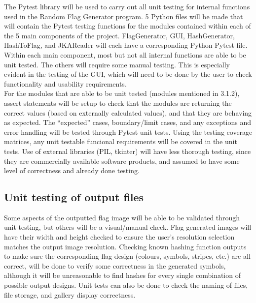 \documentclass[12pt, titlepage]{article}
\begin{document}
The Pytest library will be used to carry out all unit testing for internal
functions used in the Random Flag Generator program. 5 Python files will be
made that will contain the Pytest testing functions for the modules contained
within each of the 5 main components of the project. FlagGenerator, GUI,
HashGenerator, HashToFlag, and JKAReader will each have a corresponding Python
Pytest file. Within each main component, most but not all internal functions
are able to be unit tested. The others will require some manual testing. This
is especially evident in the testing of the GUI, which will need to be done by
the user to check functionality and usability requirements. \\

\noindent For the modules that are able to be unit tested (modules mentioned
in 3.1.2), assert statements will be setup to check that the modules are
returning the correct values (based on externally calculated values), and that
they are behaving as expected. The ``expected'' cases, boundary/limit cases,
and any exceptions and error handling will be tested through Pytest unit
tests. Using the testing coverage matrices, any unit testable funcional
requirements will be covered in the unit tests. Use of external libraries
(PIL, tkinter) will have less thorough testing, since they are commercially
available software products, and assumed to have some level of correctness and
already done testing.

\subsection{Unit testing of output files}

\noindent Some aspects of the outputted flag image will be able to be
validated through unit testing, but others will be a visual/manual check. Flag
generated images will have their width and height checked to ensure the user's
resolution selection matches the output image resolution. Checking known
hashing function outputs to make sure the corresponding flag design (colours,
symbols, stripes, etc.) are all correct, will be done to verify some
correctness in the generated symbols, although it will be unreasonable to find
hashes for every single combination of possible output designs. Unit tests can
also be done to check the naming of files, file storage, and gallery display
correctness.




\end{document}
